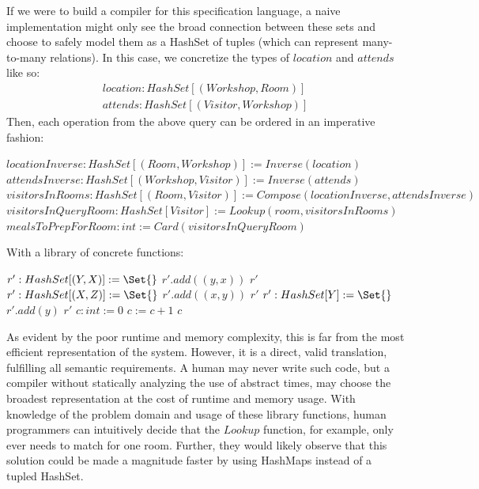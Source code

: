 If we were to build a compiler for this specification language, a naive implementation might only see the broad connection between these sets and choose to safely model them as a HashSet of tuples (which can represent many-to-many relations). In this case, we concretize the types of $location$ and $attends$ like so:
\begin{gather*}
    location: HashSet[(Workshop, Room)]\\
    attends: HashSet[(Visitor, Workshop)]
\end{gather*}
Then, each operation from the above query can be ordered in an imperative fashion:
\begin{algorithmic}
    \State $locationInverse: HashSet[(Room, Workshop)] := Inverse(location)$
    \State $attendsInverse: HashSet[(Workshop, Visitor)] := Inverse(attends)$
    \State $visitorsInRooms: HashSet[(Room, Visitor)] := Compose(locationInverse, attendsInverse)$
    \State $visitorsInQueryRoom: HashSet[Visitor] := Lookup(room, visitorsInRooms)$
    \State $mealsToPrepForRoom: int := Card(visitorsInQueryRoom)$
\end{algorithmic}
With a library of concrete functions:
\begin{algorithmic}
        \State $r': HashSet[(Y, X)] := \Set{}$
            \State $r'.add((y,x))$ 
        \EndFor
        \Return $r'$
    \EndFunction
        \State $r': HashSet[(X,Z)] := \Set{}$
                    \State $r'.add((x,y))$
                \EndIf
            \EndFor
        \EndFor
        \Return $r'$
    \EndFunction
        \State $r': HashSet[Y] := \Set{}$
                \State $r'.add(y)$
            \EndIf
        \EndFor
        \Return $r'$
    \EndFunction
        \State $c: int := 0$
            \State $c := c + 1$
        \EndFor
        \Return $c$
    \EndFunction
\end{algorithmic}
As evident by the poor runtime and memory complexity, this is far from the most efficient representation of the system. However, it is a direct, valid translation, fulfilling all semantic requirements. A human may never write such code, but a compiler without statically analyzing the use of abstract times, may choose the broadest representation at the cost of runtime and memory usage. With knowledge of the problem domain and usage of these library functions, human programmers can intuitively decide that the $Lookup$ function, for example, only ever needs to match for one room. Further, they would likely observe that this solution could be made a magnitude faster by using HashMaps instead of a tupled HashSet.

